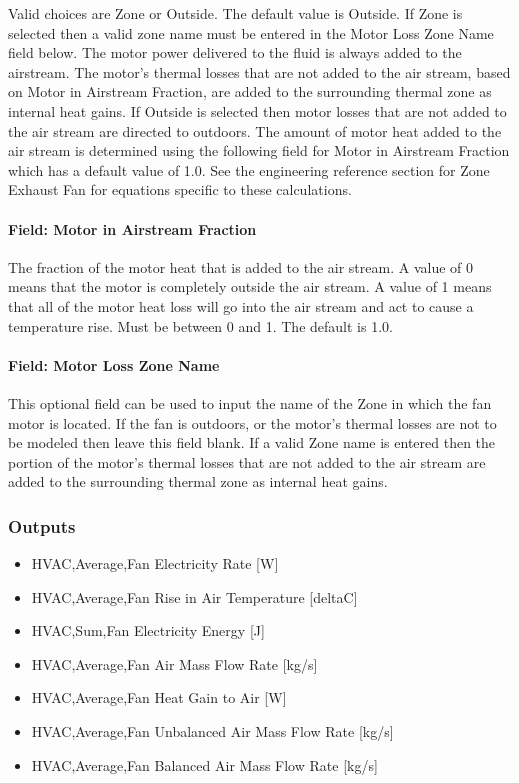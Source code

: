 Valid choices are Zone or Outside. The default value is Outside. If Zone is selected then a valid zone name must be entered in the Motor Loss Zone Name field below. The motor power delivered to the fluid is always added to the airstream. The motor's thermal losses that are not added to the air stream, based on Motor in Airstream Fraction, are added to the surrounding thermal zone as internal heat gains. If Outside is selected then motor losses that are not added to the air stream are directed to outdoors. The amount of motor heat added to the air stream is determined using the following field for Motor in Airstream Fraction which has a default value of 1.0. See the engineering reference section for Zone Exhaust Fan for equations specific to these calculations.

\paragraph{Field: Motor in Airstream Fraction}\label{field-motor-in-airstream-fraction-31}

The fraction of the motor heat that is added to the air stream. A value of 0 means that the motor is completely outside the air stream. A value of 1 means that all of the motor heat loss will go into the air stream and act to cause a temperature rise. Must be between 0 and 1. The default is 1.0.

\paragraph{Field: Motor Loss Zone Name}\label{field-loss-zone-name-fanzoneexhaustl}

This optional field can be used to input the name of the Zone in which the fan motor is located.  If the fan is outdoors, or the motor's thermal losses are not to be modeled then leave this field blank.  If a valid Zone name is entered then the portion of the motor's thermal losses that are not added to the air stream are added to the surrounding thermal zone as internal heat gains.


\subsubsection{Outputs}\label{outputs-3-007}

\begin{itemize}
\item
  HVAC,Average,Fan Electricity Rate {[}W{]}
\item
  HVAC,Average,Fan Rise in Air Temperature {[}deltaC{]}
\item
  HVAC,Sum,Fan Electricity Energy {[}J{]}
\item
  HVAC,Average,Fan Air Mass Flow Rate {[}kg/s{]}
\item
  HVAC,Average,Fan Heat Gain to Air {[}W{]}
\item
  HVAC,Average,Fan Unbalanced Air Mass Flow Rate {[}kg/s{]}
\item
  HVAC,Average,Fan Balanced Air Mass Flow Rate {[}kg/s{]}
\end{itemize}

